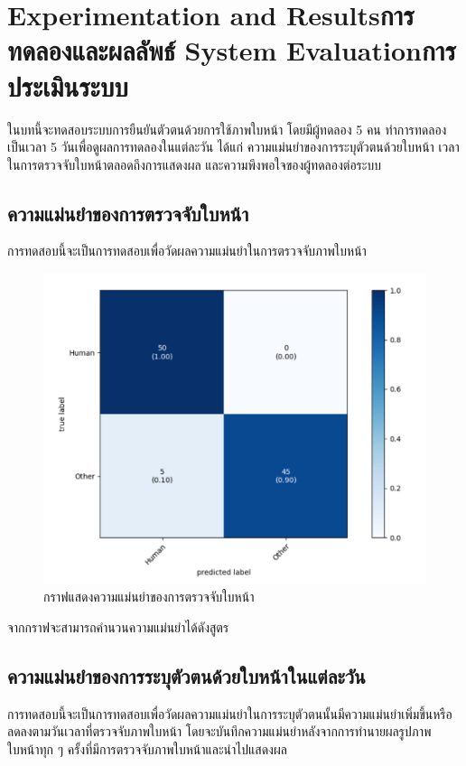 \chapter{\ifproject%
\ifenglish Experimentation and Results\else การทดลองและผลลัพธ์\fi
\else%
\ifenglish System Evaluation\else การประเมินระบบ\fi
\fi}

ในบทนี้จะทดสอบระบบการยืนยันตัวตนด้วยการใช้ภาพใบหน้า โดยมีผู้ทดลอง 5 คน 
ทำการทดลองเป็นเวลา 5 วันเพื่อดูผลการทดลองในแต่ละวัน ได้แก่ ความแม่นยำของการระบุตัวตนด้วยใบหน้า 
เวลาในการตรวจจับใบหน้าตลอดถึงการแสดงผล และความพึงพอใจของผู้ทดลองต่อระบบ

\section{ความแม่นยำของการตรวจจับใบหน้า}
การทดสอบนี้จะเป็นการทดสอบเพื่อวัดผลความแม่นยำในการตรวจจับภาพใบหน้า

\begin{figure}[!ht]
  \begin{center}
    \includegraphics[scale=.45]{pic/face_result.png}
    \caption[กราฟแสดงความแม่นยำของการตรวจจับใบหน้า]{กราฟแสดงความแม่นยำของการตรวจจับใบหน้า}
    \label{fig:acc_graph}
  \end{center}
\end{figure}

\indent จากกราฟจะสามารถคำนวนความแม่นยำได้ดังสูตร 

\section{ความแม่นยำของการระบุตัวตนด้วยใบหน้าในแต่ละวัน}
การทดสอบนี้จะเป็นการทดสอบเพื่อวัดผลความแม่นยำในการระบุตัวตนนั้นมีความแม่นยำเพิ่มขึ้นหรือลดลงตามวันเวลาที่ตรวจจับภาพใบหน้า
โดยจะบันทึกความแม่นยำหลังจากการทำนายผลรูปภาพใบหน้าทุก ๆ ครั้งที่มีการตรวจจับภาพใบหน้าและนำไปแสดงผล

